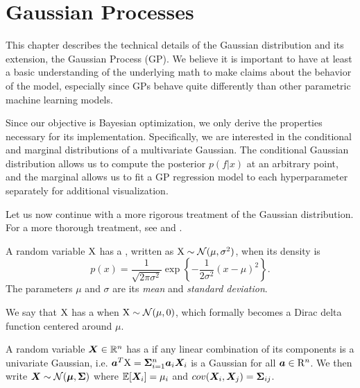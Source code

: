 \chapter{Gaussian Processes}
\label{chapter:gp}

This chapter describes the technical details of the Gaussian distribution and
its extension, the Gaussian Process (GP). We believe it is important to have at
least a basic understanding of the underlying math to make claims
about the behavior of the model, especially since GPs behave quite differently
than other parametric machine learning models.

Since our objective is Bayesian optimization, we only derive the properties
necessary for its implementation. Specifically, we are interested in the
conditional and marginal distributions of a multivariate Gaussian. The
conditional Gaussian distribution allows us to compute the posterior $p(f|x)$
at an arbitrary point, and the marginal allows us to fit a GP regression model
to each hyperparameter separately for additional visualization.

Let us now continue with a more rigorous treatment of the Gaussian distribution.
For a more thorough treatment, see \cite{bishop2016pattern} and \cite{murphy2012machine}.

\begin{defn}
  A random variable ${\textnormal{X}}$ has a ,
  written as ${\textnormal{X}} \sim \mathcal{N}(\mu, \sigma^2)$, when its density is
  $$
    p(x) = \frac{1}{\sqrt{2\pi\sigma^2}} \exp{\left\{ -\frac{1}{2\sigma^2} (x - \mu)^2 \right\}}.
  $$
  The parameters $\mu$ and $\sigma$ are its \emph{mean} and \emph{standard deviation}.
\end{defn}

\begin{defn}
  We say that ${\textnormal{X}}$ has a  when ${\textnormal{X}} \sim \mathcal{N}(\mu, 0)$, which formally becomes a Dirac delta function centered around $\mu$.
\end{defn}

\begin{defn}
  A random variable ${\bm{X}} \in \mathbb{R}^n$ has a  if
  any linear combination of its components is a univariate Gaussian, i.e.
  ${\boldsymbol{a}}^T {\textnormal{X}} = {\bm{\Sigma}}_{i=1}^n {\boldsymbol{a}}_i {\bm{X}}_i$ is a Gaussian for all ${\boldsymbol{a}} \in \mathrm{R}^n$.
  We then write ${\bm{X}} \sim \mathcal{N}({\boldsymbol{\mu}}, {\bm{\Sigma}})$ where $\mathbb{E}[{\bm{X}}_i] = \mu_i$
  and $cov({\bm{X}}_i, {\bm{X}}_j) = {\bm{\Sigma}}_{ij}$.
\end{defn}


